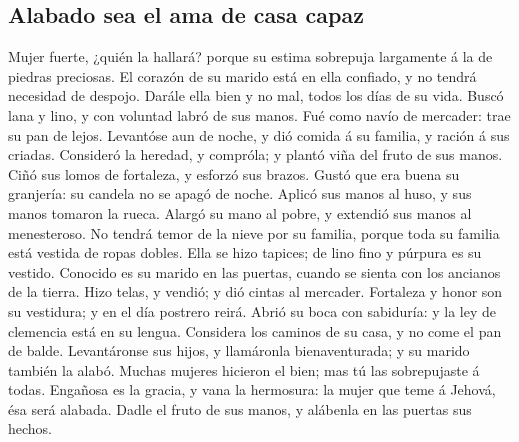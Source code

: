 \hypertarget{alabado-sea-el-ama-de-casa-capaz}{%
\subsection{Alabado sea el ama de casa
capaz}\label{alabado-sea-el-ama-de-casa-capaz}}

 Mujer fuerte, ¿quién la hallará? porque su estima
sobrepuja largamente á la de piedras preciosas.  El corazón
de su marido está en ella confiado, y no tendrá necesidad de despojo.
 Darále ella bien y no mal, todos los días de su vida.
 Buscó lana y lino, y con voluntad labró de sus manos.
 Fué como navío de mercader: trae su pan de lejos.
 Levantóse aun de noche, y dió comida á su familia, y
ración á sus criadas.  Consideró la heredad, y compróla; y
plantó viña del fruto de sus manos.  Ciñó sus lomos de
fortaleza, y esforzó sus brazos.  Gustó que era buena su
granjería: su candela no se apagó de noche.  Aplicó sus
manos al huso, y sus manos tomaron la rueca.  Alargó su
mano al pobre, y extendió sus manos al menesteroso.  No
tendrá temor de la nieve por su familia, porque toda su familia está
vestida de ropas dobles.  Ella se hizo tapices; de lino
fino y púrpura es su vestido.  Conocido es su marido en las
puertas, cuando se sienta con los ancianos de la tierra. 
Hizo telas, y vendió; y dió cintas al mercader.  Fortaleza
y honor son su vestidura; y en el día postrero reirá. 
Abrió su boca con sabiduría: y la ley de clemencia está en su lengua.
 Considera los caminos de su casa, y no come el pan de
balde.  Levantáronse sus hijos, y llamáronla
bienaventurada; y su marido también la alabó.  Muchas
mujeres hicieron el bien; mas tú las sobrepujaste á todas. 
Engañosa es la gracia, y vana la hermosura: la mujer que teme á Jehová,
ésa será alabada.  Dadle el fruto de sus manos, y alábenla
en las puertas sus hechos.
